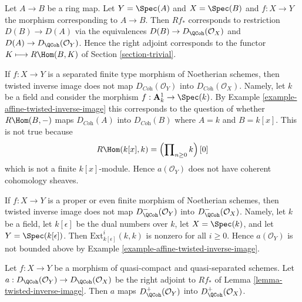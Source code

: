 \begin{example}
\label{example-affine-twisted-inverse-image}
Let $A \to B$ be a ring map. Let $Y = \Spec(A)$ and $X = \Spec(B)$
and $f : X \to Y$ the morphism corresponding to $A \to B$.
Then $Rf_*$ corresponds to restriction $D(B) \to D(A)$ via
the equivalences $D(B) \to D_\QCoh(\mathcal{O}_X)$ and
$D(A) \to D_\QCoh(\mathcal{O}_Y)$. Hence the right adjoint
corresponds to the functor $K \longmapsto R\Hom(B, K)$ of
Section \ref{section-trivial}.
\end{example}

\begin{example}
\label{example-does-not-preserve-coherent}
If $f : X \to Y$ is a separated finite type morphism of Noetherian schemes,
then twisted inverse image does not map $D_{\textit{Coh}}(\mathcal{O}_Y)$ into
$D_{\textit{Coh}}(\mathcal{O}_X)$. Namely, let $k$ be a field and
consider the morphism $f : \mathbf{A}^1_k \to \Spec(k)$. By
Example \ref{example-affine-twisted-inverse-image}
this corresponds to the question of whether
$R\Hom(B, -)$ maps $D_{\textit{Coh}}(A)$ into $D_{\textit{Coh}}(B)$
where $A = k$ and $B = k[x]$. This is not true because
$$
R\Hom(k[x], k) = \left(\prod\nolimits_{n \geq 0} k\right)[0]
$$
which is not a finite $k[x]$-module. Hence $a(\mathcal{O}_Y)$
does not have coherent cohomology sheaves.
\end{example}

\begin{example}
\label{example-does-not-preserve-bounded-above}
If $f : X \to Y$ is a proper or even finite morphism of Noetherian schemes,
then twisted inverse image does not map $D_\QCoh^-(\mathcal{O}_Y)$ into
$D_\QCoh^-(\mathcal{O}_X)$. Namely, let $k$ be a field, let
$k[\epsilon]$ be the dual numbers over $k$, let
$X = \Spec(k)$, and let $Y = \Spec(k[\epsilon])$.
Then $\text{Ext}^i_{k[\epsilon]}(k, k)$ is nonzero for all $i \geq 0$.
Hence $a(\mathcal{O}_Y)$ is not bounded above
by Example \ref{example-affine-twisted-inverse-image}.
\end{example}

\begin{lemma}
\label{lemma-twisted-inverse-image-bounded-below}
Let $f : X \to Y$ be a morphism of quasi-compact and quasi-separated
schemes. Let $a : D_\QCoh(\mathcal{O}_Y) \to D_\QCoh(\mathcal{O}_X)$
be the right adjoint to $Rf_*$ of Lemma \ref{lemma-twisted-inverse-image}.
Then $a$ maps $D^+_\QCoh(\mathcal{O}_Y)$ into $D^+_\QCoh(\mathcal{O}_X)$.
\end{lemma}

